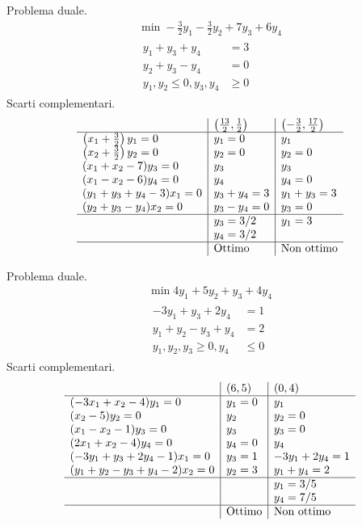 Problema duale.
\begin{gather*}
\min -\frac{3}{2} y_{1} -\frac{3}{2} y_{2} +7y_{3} +6y_{4}\\
\begin{aligned}
y_{1} +y_{3} +y_{4} & =3\\
y_{2} +y_{3} -y_{4} & =0\\
y_{1} ,y_{2} \leq 0,y_{3} ,y_{4} & \geq 0
\end{aligned}
\end{gather*}
Scarti complementari.
\begin{equation*}
\begin{array}{ l|l|l }
 & \left(\frac{13}{2} ,\frac{1}{2}\right) & \left( -\frac{3}{2} ,\frac{17}{2}\right)\\
\hline
\left( x_{1} +\frac{3}{2}\right) y_{1} =0 & y_{1} =0 & y_{1}\\
\left( x_{2} +\frac{3}{2}\right) y_{2} =0 & y_{2} =0 & y_{2} =0\\
( x_{1} +x_{2} -7) y_{3} =0 & y_{3} & y_{3}\\
( x_{1} -x_{2} -6) y_{4} =0 & y_{4} & y_{4} =0\\
( y_{1} +y_{3} +y_{4} -3) x_{1} =0 & y_{3} +y_{4} =3 & y_{1} +y_{3} =3\\
( y_{2} +y_{3} -y_{4}) x_{2} =0 & y_{3} -y_{4} =0 & y_{3} =0\\
\hline
 & y_{3} =3/2 & y_{1} =3\\
 & y_{4} =3/2 & \\
\hline
 & \text{Ottimo} & \text{Non ottimo}
\end{array}
\end{equation*}
\Es

Problema duale.
\begin{gather*}
\min 4y_{1} +5y_{2} +y_{3} +4y_{4}\\
\begin{aligned}
-3y_{1} +y_{3} +2y_{4} & =1\\
y_{1} +y_{2} -y_{3} +y_{4} & =2\\
y_{1} ,y_{2} ,y_{3} \geq 0,y_{4} & \leq 0
\end{aligned}
\end{gather*}
Scarti complementari.
\begin{equation*}
\begin{array}{ l|l|l }
 & ( 6,5) & ( 0,4)\\
\hline
( -3x_{1} +x_{2} -4) y_{1} =0 & y_{1} =0 & y_{1}\\
( x_{2} -5) y_{2} =0 & y_{2} & y_{2} =0\\
( x_{1} -x_{2} -1) y_{3} =0 & y_{3} & y_{3} =0\\
( 2x_{1} +x_{2} -4) y_{4} =0 & y_{4} =0 & y_{4}\\
( -3y_{1} +y_{3} +2y_{4} -1) x_{1} =0 & y_{3} =1 & -3y_{1} +2y_{4} =1\\
( y_{1} +y_{2} -y_{3} +y_{4} -2) x_{2} =0 & y_{2} =3 & y_{1} +y_{4} =2\\
\hline
 &  & y_{1} =3/5\\
 &  & y_{4} =7/5\\
\hline
 & \text{Ottimo} & \text{Non ottimo}
\end{array}
\end{equation*}